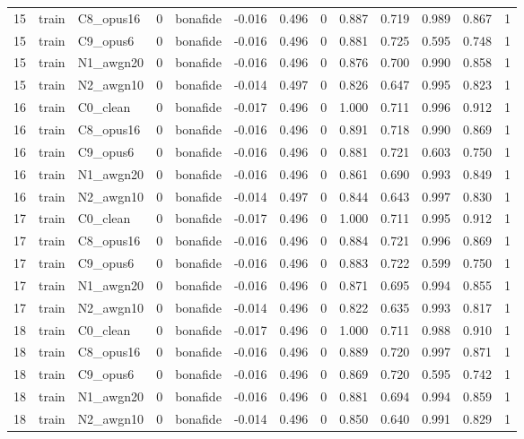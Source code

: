 \begin{tabular}{rllrlrrrrrrrr}
15 & train & C8_opus16 & 0 & bonafide & -0.016 & 0.496 & 0 & 0.887 & 0.719 & 0.989 & 0.867 & 1 \\
15 & train & C9_opus6 & 0 & bonafide & -0.016 & 0.496 & 0 & 0.881 & 0.725 & 0.595 & 0.748 & 1 \\
15 & train & N1_awgn20 & 0 & bonafide & -0.016 & 0.496 & 0 & 0.876 & 0.700 & 0.990 & 0.858 & 1 \\
15 & train & N2_awgn10 & 0 & bonafide & -0.014 & 0.497 & 0 & 0.826 & 0.647 & 0.995 & 0.823 & 1 \\
16 & train & C0_clean & 0 & bonafide & -0.017 & 0.496 & 0 & 1.000 & 0.711 & 0.996 & 0.912 & 1 \\
16 & train & C8_opus16 & 0 & bonafide & -0.016 & 0.496 & 0 & 0.891 & 0.718 & 0.990 & 0.869 & 1 \\
16 & train & C9_opus6 & 0 & bonafide & -0.016 & 0.496 & 0 & 0.881 & 0.721 & 0.603 & 0.750 & 1 \\
16 & train & N1_awgn20 & 0 & bonafide & -0.016 & 0.496 & 0 & 0.861 & 0.690 & 0.993 & 0.849 & 1 \\
16 & train & N2_awgn10 & 0 & bonafide & -0.014 & 0.497 & 0 & 0.844 & 0.643 & 0.997 & 0.830 & 1 \\
17 & train & C0_clean & 0 & bonafide & -0.017 & 0.496 & 0 & 1.000 & 0.711 & 0.995 & 0.912 & 1 \\
17 & train & C8_opus16 & 0 & bonafide & -0.016 & 0.496 & 0 & 0.884 & 0.721 & 0.996 & 0.869 & 1 \\
17 & train & C9_opus6 & 0 & bonafide & -0.016 & 0.496 & 0 & 0.883 & 0.722 & 0.599 & 0.750 & 1 \\
17 & train & N1_awgn20 & 0 & bonafide & -0.016 & 0.496 & 0 & 0.871 & 0.695 & 0.994 & 0.855 & 1 \\
17 & train & N2_awgn10 & 0 & bonafide & -0.014 & 0.496 & 0 & 0.822 & 0.635 & 0.993 & 0.817 & 1 \\
18 & train & C0_clean & 0 & bonafide & -0.017 & 0.496 & 0 & 1.000 & 0.711 & 0.988 & 0.910 & 1 \\
18 & train & C8_opus16 & 0 & bonafide & -0.016 & 0.496 & 0 & 0.889 & 0.720 & 0.997 & 0.871 & 1 \\
18 & train & C9_opus6 & 0 & bonafide & -0.016 & 0.496 & 0 & 0.869 & 0.720 & 0.595 & 0.742 & 1 \\
18 & train & N1_awgn20 & 0 & bonafide & -0.016 & 0.496 & 0 & 0.881 & 0.694 & 0.994 & 0.859 & 1 \\
18 & train & N2_awgn10 & 0 & bonafide & -0.014 & 0.496 & 0 & 0.850 & 0.640 & 0.991 & 0.829 & 1 \\

\end{tabular}
